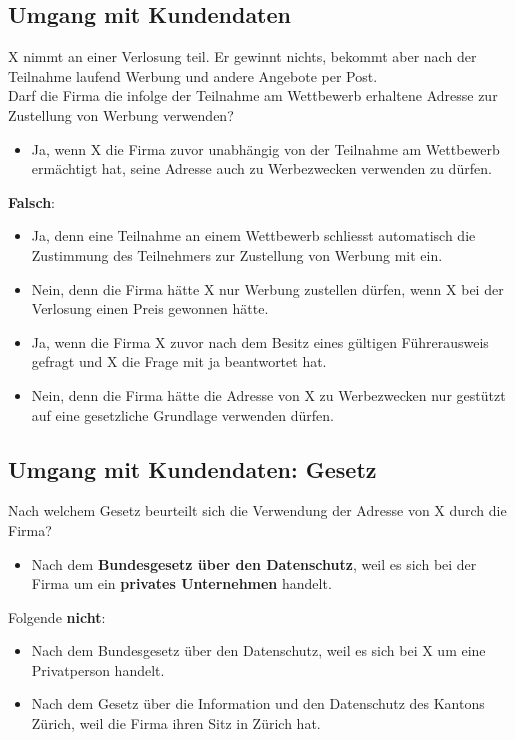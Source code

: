 \subsection{Umgang mit Kundendaten}
X nimmt an einer Verlosung teil. Er gewinnt nichts, bekommt aber nach der Teilnahme laufend Werbung und andere Angebote per Post.\\
Darf die Firma die infolge der Teilnahme am Wettbewerb erhaltene Adresse zur Zustellung von Werbung verwenden?
\begin{itemize}
	\item Ja, wenn X die Firma zuvor unabhängig von der Teilnahme am Wettbewerb ermächtigt hat, seine Adresse auch zu Werbezwecken verwenden zu dürfen.
\end{itemize}
\begin{Large}
	\textbf{Falsch}:
\end{Large}
\begin{itemize}
	\item Ja, denn eine Teilnahme an einem Wettbewerb schliesst automatisch die Zustimmung des Teilnehmers zur Zustellung von Werbung mit ein.
	\item Nein, denn die Firma hätte X nur Werbung zustellen dürfen, wenn X bei der
	Verlosung einen Preis gewonnen hätte.
	\item Ja, wenn die Firma X zuvor nach dem Besitz eines gültigen Führerausweis gefragt und
	X die Frage mit ja beantwortet hat.
	\item Nein, denn die Firma hätte die Adresse von X zu Werbezwecken nur gestützt auf eine
	gesetzliche Grundlage verwenden dürfen.
\end{itemize}

\subsection{Umgang mit Kundendaten: Gesetz}
Nach welchem Gesetz beurteilt sich die Verwendung der Adresse von X durch die Firma?
\begin{itemize}
	\item Nach dem \textbf{Bundesgesetz über den Datenschutz}, weil es sich bei der Firma um ein \textbf{privates Unternehmen} handelt. 
\end{itemize}
\begin{Large}
	Folgende \textbf{nicht}:
\end{Large}
\begin{itemize}
	\item Nach dem Bundesgesetz über den Datenschutz, weil es sich bei X um eine Privatperson handelt.
	\item Nach dem Gesetz über die Information und den Datenschutz des Kantons Zürich, weil die Firma ihren Sitz in Zürich hat.
\end{itemize}

